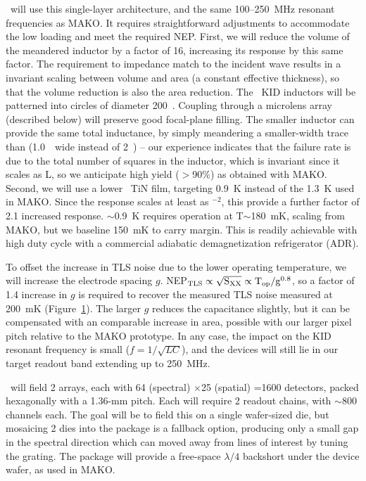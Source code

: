 \begin{figure}[t!]
\begin{center}
\linefig\vspace{-0.35in} \label{fig:makonew}
\end{center}
\end{figure}

\vspace{0.05in}{\bf Pixel design for \icaris.} \icaris\ will use this single-layer architecture, and the same 100--250~MHz resonant frequencies as MAKO.  It requires straightforward adjustments to accommodate the low loading and meet the required NEP.  First, we will reduce the volume of the meandered inductor by a factor of 16, increasing its response by this same factor.  The requirement to impedance match to the incident wave results in a invariant scaling between volume and area (a constant effective thickness), so that the volume reduction is also the area reduction.  The \icaris\ KID inductors will be patterned into circles of diameter 200~\mum.  Coupling through a microlens array (described below) will preserve good focal-plane filling.  The smaller inductor can provide the same total inductance, by simply meandering a smaller-width trace than (1.0~\mum\ wide instead of 2~\mum) -- our experience indicates that the failure rate is due to the total number of squares in the inductor, which is invariant since it scales as L, so we anticipate high yield ($>$90\%) as obtained with MAKO.  Second, we will use a lower \Tc\ TiN film, targeting 0.9~K instead of the 1.3~K used in MAKO.   Since the response scales at least as \Tc$^{-2}$, this provide a further factor of 2.1 increased response.  \Tc$\sim$0.9~K requires operation at T$\sim$180~mK, scaling from MAKO, but we baseline 150~mK to carry margin.  This is readily achievable with high duty cycle with a commercial adiabatic demagnetization refrigerator (ADR).   

To offset the increase in TLS noise due to the lower operating temperature, we will increase the electrode spacing $g$.  NEP$_{\rm TLS} \propto \sqrt{\rm S_{\rm XX}} \propto \rm T_{\rm op} / g^{0.8}$, so a factor of 1.4 increase in $g$ is required to recover the measured TLS noise measured at 200~mK (Figure~\ref{fig:makonew}).   The larger $g$ reduces the capacitance slightly, but it can be compensated with an comparable increase in area, possible with our larger pixel pitch relative to the MAKO prototype.  In any case, the impact on the KID resonant frequency is small ($f=1/\sqrt{LC}$), and the devices will still lie in our target readout band extending up to 250~MHz.

\icaris\ will field 2 arrays, each with 64 (spectral) $\times$25 (spatial) =1600 detectors, packed hexagonally with a 1.36-mm pitch.  Each will require 2 readout chains, with $\sim$800 channels each.  The goal will be to field this on a single wafer-sized die, but mosaicing 2 dies into the package is a fallback option, producing only a small gap in the spectral direction which can moved away from lines of interest by tuning the grating.  The package will provide a free-space $\lambda/4$ backshort under the device wafer, as used in MAKO.


